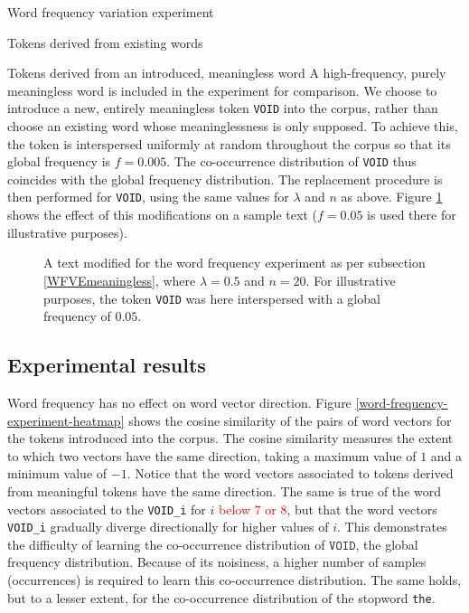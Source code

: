 \documentclass{article} %
\newcommand{\word}[1]{\texttt{#1}}
\begin{document}
\begin{section}{Word frequency variation experiment}
\begin{subsection}{Tokens derived from existing words}
\end{subsection}

\begin{subsection}{Tokens derived from an introduced, meaningless word}\label{WFVEmeaningless}
	A high-frequency, purely meaningless word is included in the experiment for comparison.
	We choose to introduce a new, entirely meaningless token \word{VOID} into the corpus, rather than choose an existing word whose meaninglessness is only supposed.
	To achieve this, the token is interspersed uniformly at random throughout the corpus so that its global frequency is $f = 0.005$.
	The co-occurrence distribution of \word{VOID} thus coincides with the global frequency distribution.
	The replacement procedure is then performed for \word{VOID}, using the same values for $\lambda$ and $n$ as above.
	Figure \ref{fig:word-frequency-experiment-text-void} shows the effect of this modifications on a sample text ($f = 0.05$ is used there for illustrative purposes).

\begin{figure}\label{fig:word-frequency-experiment-text-void}
	\begin{mdframed}
	
	\end{mdframed}
	\caption{A text modified for the word frequency experiment as per subsection \ref{WFVEmeaningless}, where $\lambda=0.5$ and $n=20$. For illustrative purposes, the token \word{VOID} was here interspersed with a global frequency of $0.05$.}
\end{figure}
\end{subsection}

\subsection{Experimental results}
Word frequency has no effect on word vector direction.
Figure \ref{word-frequency-experiment-heatmap} shows the cosine similarity of the pairs of word vectors for the tokens introduced into the corpus.
The cosine similarity measures the extent to which two vectors have the same direction, taking a maximum value of $1$ and a minimum value of $-1$.
Notice that the word vectors associated to tokens derived from meaningful tokens have the same direction.
The same is true of the word vectors associated to the \word{VOID\_i} for $i$ \textcolor{red}{below $7$ or $8$}, but that the word vectors \word{VOID\_i} gradually diverge directionally for higher values of $i$.
This demonstrates the difficulty of learning the co-occurrence distribution of $\word{VOID}$, the global frequency distribution.
Because of its noisiness, a higher number of samples (occurrences) is required to learn this co-occurrence distribution.
The same holds, but to a lesser extent, for the co-occurrence distribution of the stopword \word{the}.


\end{section}
\end{document}
